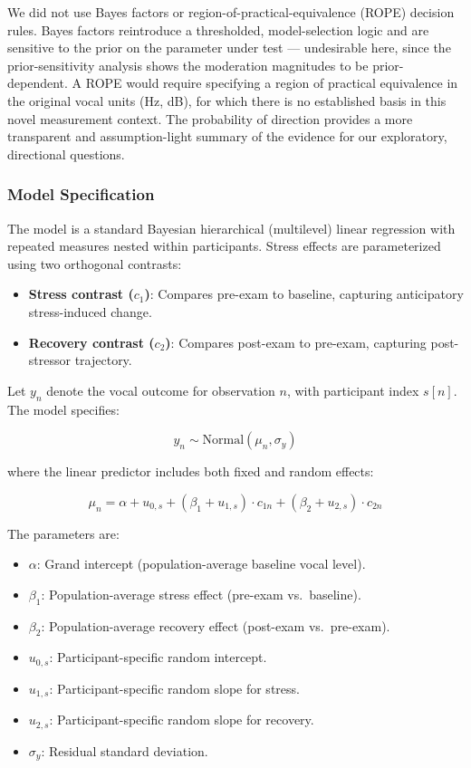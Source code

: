 \documentclass[
  english,
  man,floatsintext]{apa6}
\providecommand{\tightlist}{%
  \setlength{\itemsep}{0pt}\setlength{\parskip}{0pt}}
\begin{document}
We did not use Bayes factors or region-of-practical-equivalence (ROPE) decision rules.
Bayes factors reintroduce a thresholded, model-selection logic and are sensitive to the
prior on the parameter under test --- undesirable here, since the prior-sensitivity analysis
shows the moderation magnitudes to be prior-dependent. A ROPE would require specifying a
region of practical equivalence in the original vocal units (Hz, dB), for which there is no
established basis in this novel measurement context. The probability of direction provides
a more transparent and assumption-light summary of the evidence for our exploratory,
directional questions.

\subsubsection{Model Specification}\label{model-specification}

The model is a standard Bayesian hierarchical (multilevel) linear regression with repeated measures nested within participants. Stress effects are parameterized using two orthogonal contrasts:

\begin{itemize}
\tightlist
\item
  \textbf{Stress contrast (\(c_1\))}: Compares pre-exam to baseline, capturing anticipatory stress-induced change.
\item
  \textbf{Recovery contrast (\(c_2\))}: Compares post-exam to pre-exam, capturing post-stressor trajectory.
\end{itemize}

Let \(y_n\) denote the vocal outcome for observation \(n\), with participant index \(s[n]\). The model specifies:

\[
y_n \sim \text{Normal}(\mu_n, \sigma_y)
\]

where the linear predictor includes both fixed and random effects:

\[
\mu_n = \alpha + u_{0,s} + (\beta_1 + u_{1,s}) \cdot c_{1n} + (\beta_2 + u_{2,s}) \cdot c_{2n}
\]

The parameters are:

\begin{itemize}
\tightlist
\item
  \(\alpha\): Grand intercept (population-average baseline vocal level).
\item
  \(\beta_1\): Population-average stress effect (pre-exam vs.~baseline).
\item
  \(\beta_2\): Population-average recovery effect (post-exam vs.~pre-exam).
\item
  \(u_{0,s}\): Participant-specific random intercept.
\item
  \(u_{1,s}\): Participant-specific random slope for stress.
\item
  \(u_{2,s}\): Participant-specific random slope for recovery.
\item
  \(\sigma_y\): Residual standard deviation.
\end{itemize}
\end{document}
